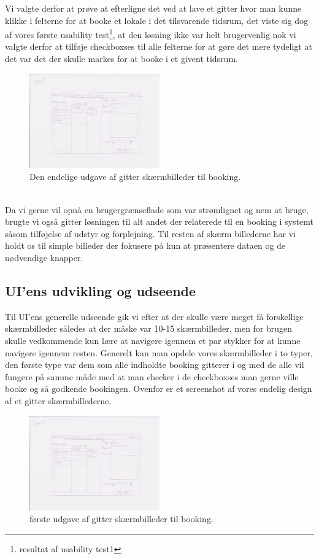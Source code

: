 Vi valgte derfor at prøve at efterligne det ved at lave et gitter hvor man kunne klikke i felterne for at booke et lokale i det tilsvarende tidsrum, det viste sig dog af vores første usability test\footnote{resultat af usability test1}, at den løsning ikke var helt brugervenlig nok vi valgte derfor at tilføje checkboxses til alle felterne for at gøre det mere tydeligt at det var det der skulle markes for at booke i et givent tidsrum.
\begin{figure}[h!]
  \caption{Den endelige udgave af gitter skærmbilleder til booking.}
  \centering
    \includegraphics[width=0.5\textwidth]{Appendix/GUI-Prototype/PaperMockup/UdstyrsListe}
\end{figure}
\\Da vi gerne vil opnå en brugergrænseflade som var strømlignet og nem at bruge, brugte vi også gitter løsningen til alt andet der relaterede til en booking i systemt såsom tilføjelse af  udstyr og forplejning. Til resten af skærm billederne har vi holdt os til simple billeder der fokusere på kun at præsentere dataen og de nødvendige knapper.

\subsection{UI'ens udvikling og udseende}
Til UI'ens generelle udseende gik vi efter at der skulle være meget få forskellige skærmbilleder således at der måske var 10-15 skærmbilleder, men for brugen skulle vedkommende kun lære at navigere igennem et par stykker for at kunne navigere igennem resten.
Generelt kan man opdele vores skærmbilleder i to typer, den første type var dem som alle indholdte booking gitterer i og med de alle vil fungere på samme måde med at man checker i de checkboxses man gerne ville booke og så godkende bookingen.
Ovenfor er et screenshot af vores endelig design af et gitter skærmbillederne.
\begin{figure}[h!]
  \caption{første udgave af gitter skærmbilleder til booking.}
  \centering
    \includegraphics[width=0.5\textwidth]{Appendix/GUI-Prototype/PaperMockup/UdstyrsListe}
\end{figure}


